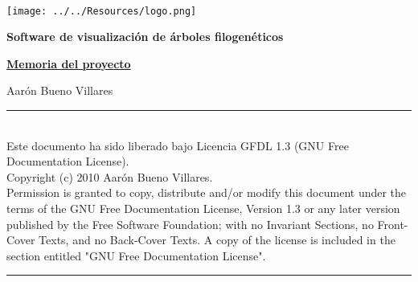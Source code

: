 %



\begin{center}

\Large{\textbf{\fpt}} \\
\vspace{.5cm}
\texttt{[image: ../../Resources/logo.png]}
\vspace{.5cm}

\Large{\textbf{Software de visualización de árboles filogenéticos}} \\

\vspace{1cm}

\huge{\textbf{\underline{Memoria del proyecto}}} \\

\vspace{0.5cm}

\tiny{Aarón Bueno Villares} \\

\vspace{0.5cm}

\end{center}

\tableofcontents

\vspace{12cm}

\begin{center}
\begin{minipage}{15cm}
\rule{15cm}{.3pt}
\\
\tiny{
Este documento ha sido liberado bajo Licencia GFDL 1.3 (GNU Free
Documentation License).\\

Copyright (c) 2010 Aarón Bueno Villares.\\

Permission is granted to copy, distribute and/or modify this document
under the terms of the GNU Free Documentation License, Version 1.3 or
any later version published by the Free Software Foundation; with no
Invariant Sections, no Front-Cover Texts, and no Back-Cover Texts. A
copy of the license is included in the section entitled "GNU Free
Documentation License".
}
\rule{15cm}{.3pt}
\end{minipage}
\end{center}
